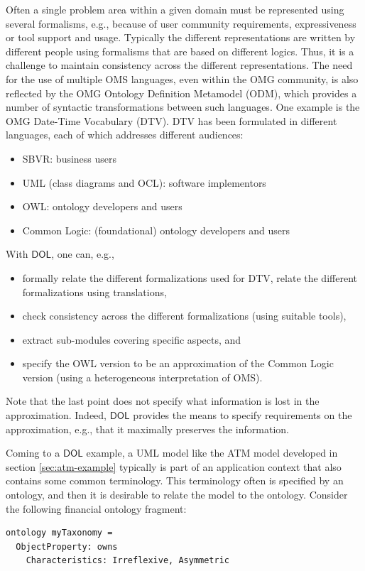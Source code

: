 \documentclass[10pt,fleqn,final]{scrreprt}
\newcommand*{\DOL}{\ensuremath{\mathsf{DOL}}\xspace}
\newenvironment{definitions}[0]{\medskip }{}
\begin{document}
\begin{definitions}
Often a single problem area within a given domain must be represented using several formalisms, e.g., because of user community requirements, expressiveness or tool support 
and usage. 
Typically the different representations are written by different people using formalisms that are based on different logics. Thus, it is a challenge to maintain 
consistency across the different representations. 
The need for the use of multiple OMS languages, even within the OMG community, is also reflected by the OMG Ontology Definition Metamodel (ODM), which 
provides a number of syntactic transformations between such languages.
One example is the OMG Date-Time Vocabulary (DTV). DTV has been formulated in different languages, each of which addresses different audiences:
\begin{itemize}
\item	 SBVR: business users
\item 	UML (class diagrams and OCL): software implementors
\item 	OWL: ontology developers and users
\item 	Common Logic: (foundational) ontology developers and users
\end{itemize}
With \DOL, one can, e.g.,
\begin{itemize}
\item 	formally relate the different formalizations used for DTV, relate the different formalizations using translations,
\item 	check consistency across the different formalizations (using suitable tools),
\item 	extract sub-modules covering specific aspects, and
\item 	specify the OWL version to be an approximation of the Common Logic version (using a heterogeneous interpretation of OMS).
\end{itemize}
Note that the last point does not specify what information is lost in the approximation. Indeed, \DOL provides the means to specify requirements on the approximation, e.g., that it maximally preserves the information. 

Coming to a \DOL example,
a UML model like the ATM model developed in section \ref{sec:atm-example} typically is part of an
application context that also contains some common terminology.
This terminology often is specified by an ontology, and then
it is desirable to relate the model to the ontology. Consider
the following financial ontology fragment:

\begin{lstlisting}[basicstyle=\ttfamily,language=dolText,alsolanguage=owl2Manchester,escapechar=@,mathescape]
ontology myTaxonomy =
  ObjectProperty: owns 
    Characteristics: Irreflexive, Asymmetric


\end{lstlisting}
\end{definitions}
\end{document}
